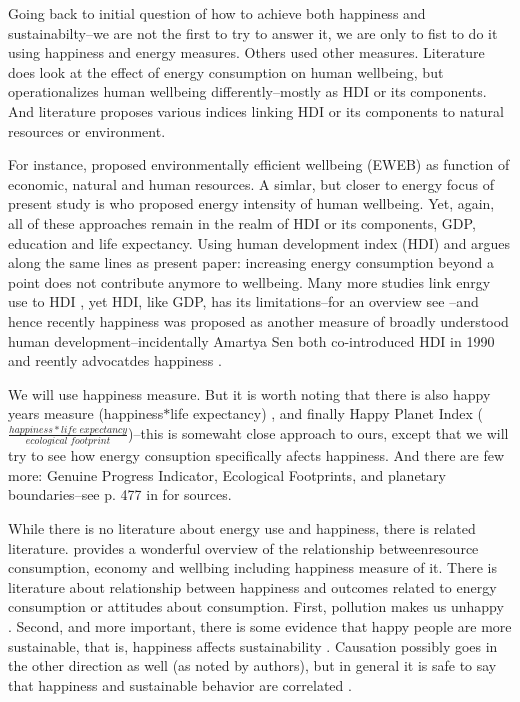 \documentclass[10pt, letterpaper]{article}
\begin{document}
\begin{spacing}{1.4}

Going back to initial question of how to achieve both happiness and
sustainabilty--we are not the first to try to answer it, we are only to fist to
do it using happiness and energy measures. Others used other measures.
Literature does look at the effect of energy consumption on human
wellbeing, but operationalizes human wellbeing differently--mostly as HDI or its
components. And literature proposes various indices linking HDI or its
components to natural resources or environment.

For instance, \cite{dietz09} proposed environmentally efficient wellbeing
(EWEB) as function of economic, natural and human resources. A simlar, but
closer to energy focus of present study is \cite{jorgenson14B} who proposed
energy intensity of human wellbeing. Yet, again, all of these approaches remain
in the realm of HDI or its components, GDP, education and life expectancy. 
 Using human development index (HDI) \cite{steinberger10} and argues along the
 same lines as present paper: increasing energy consumption beyond a point does
 not contribute anymore to wellbeing.  Many more studies link enrgy use to HDI
 \cite[e.g.]{dias06}, yet HDI, like  GDP, has its limitations--for an overview
 see \cite{klugman11}--and hence  recently happiness was proposed as another
 measure of broadly understood human  development--incidentally Amartya Sen both
 co-introduced HDI in 1990 and  reently advocatdes happiness \cite{stiglitz09al}. 

We will use happiness measure. But it is worth noting that there is also
 happy years measure (happiness$*$life expectancy) \cite{veenhoven96B}, and
 finally Happy Planet Index ($\frac{happiness*life\;expectancy}{ecological\;footprint}$)--this is somewaht close approach to  ours, except that we will try to see how energy consuption specifically afects  happiness. And there are few more: Genuine Progress Indicator, Ecological Footprints,  and planetary boundaries--see p. 477 in \cite{pretty13} for  sources. 


While there is no literature about energy use and happiness, there is related
literature. \cite{pretty13} provides a wonderful overview of the relationship
betweenresource consumption, economy and wellbing including happiness measure of
it. There is literature about relationship between happiness and outcomes
related to energy consumption or attitudes about consumption. First, pollution makes us unhappy \cite{weinhold12,welsch05}. Second,
and more important,  there is some evidence that happy people
are more sustainable, that is, happiness affects sustainability
\cite{ericson14}.  Causation possibly goes in the
other direction as well (as noted by authors), but in general it is
safe to say that happiness and sustainable behavior are correlated  \cite{brown05,corral11}.


\end{spacing}
\end{document}
